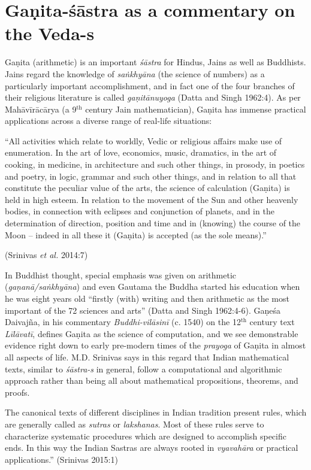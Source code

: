 \section*{Gaṇita-śāstra as a commentary on the Veda-s}

Gaṇita (arithmetic) is an important {\sl śāstra} for Hindus, Jains as well as Buddhists. Jains regard the knowledge of {\sl saṅkhyāna} (the science of numbers) as a particularly important accomplishment, and in fact one of the four branches of their religious literature is called {\sl gaṇitānuyoga} (Datta and Singh 1962:4). As per Mahāvīrācārya (a 9$^{\text{th}}$ century Jain mathematician), Gaṇita has immense practical applications across a diverse range of real-life situations: 
\begin{myquote}
``All activities which relate to worldly, Vedic or religious affairs make use of enumeration. In the art of love, economics, music, dramatics, in the art of cooking, in medicine, in architecture and such other things, in prosody, in poetics and poetry, in logic, grammar and such other things, and in relation to all that constitute the peculiar value of the arts, the science of calculation (Gaṇita) is held in high esteem. In relation to the movement of the Sun and other heavenly bodies, in connection with eclipses and conjunction of planets, and in the determination of direction, position and time and in (knowing) the course of the Moon -- indeed in all these it (Gaṇita) is accepted (as the sole means).''

\hfill (Srinivas {\sl et al.} 2014:7)
\end{myquote}

In Buddhist thought, special emphasis was given on arithmetic ({\sl gaṇanā/saṅkhyāna}) and even Gautama the Buddha started his education when he was eight years old ``firstly (with) writing and then arithmetic as the most important of the 72 sciences and arts'' (Datta and Singh 1962:4-6). Gaṇeśa Daivajña, in his commentary {\sl Buddhi-vilāsinī} (c. 1540) on the 12$^{\text{th}}$ century text {\sl Līlāvatī}, defines Gaṇita as the science of computation, and we see demonstrable evidence right down to early pre-modern times of the {\sl prayoga} of Gaṇita in almost all aspects of life. M.D. Srinivas says in this regard that Indian mathematical texts, similar to {\sl śāstra-s} in general, follow a computational and algorithmic approach rather than being all about mathematical propositions, theorems, and proofs. 
\begin{myquote}
The canonical texts of different disciplines in Indian tradition present rules, which are generally called as {\sl sutras} or {\sl lakshanas}. Most of these rules serve to characterize systematic procedures which are designed to accomplish specific ends. In this way the Indian Sastras are always rooted in {\sl vyavahāra} or practical applications.''
\hfill (Srinivas 2015:1)
\end{myquote}

